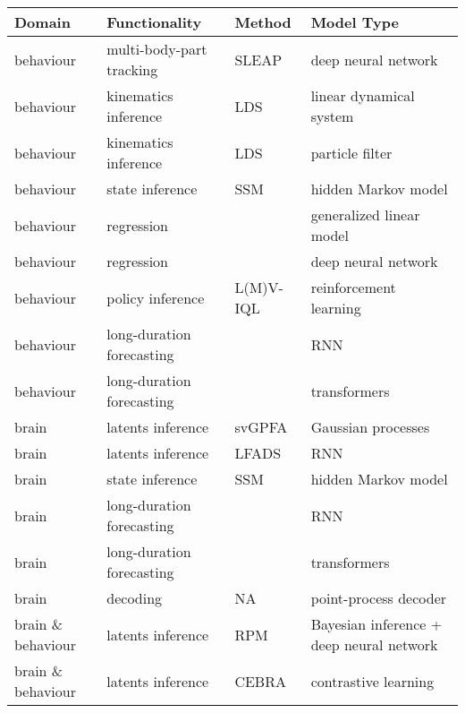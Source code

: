\begin{table}
    \caption{Initial data analysis methods to disseminate}
    \label{table:initialMethodsToDisseminate}
    \begin{longtable}{|p{1.9cm}|p{3cm}|p{2.5cm}|p{4.5cm}|}
        \hline
        \textbf{Domain} & \textbf{Functionality} & \textbf{Method} & \textbf{Model Type} \\
        \hline\hline
        behaviour & multi-body-part tracking & SLEAP & deep neural network \\
        \hline
        behaviour & kinematics inference & LDS & linear dynamical system \\
        \hline
        behaviour & kinematics inference & LDS & particle filter \\
        \hline
        behaviour & state inference & SSM & hidden Markov model \\
        \hline
        behaviour & regression &  & generalized linear model \\
        \hline
        behaviour & regression &  & deep neural network \\
        \hline
        behaviour & policy inference & L(M)V-IQL & reinforcement learning \\
        \hline
        behaviour & long-duration forecasting &  & RNN \\
        \hline
        behaviour & long-duration forecasting &  & transformers \\
        \hline\hline
        brain & latents inference & svGPFA & Gaussian processes \\
        \hline
        brain & latents inference & LFADS & RNN \\
        \hline
        brain & state inference & SSM & hidden Markov model \\
        \hline
        brain & long-duration forecasting &  & RNN \\
        \hline
        brain & long-duration forecasting &  & transformers \\
        \hline
        brain & decoding & NA & point-process decoder \\
        \hline\hline
        brain \& behaviour & latents inference & RPM & Bayesian inference + deep neural network \\
        \hline
        brain \& behaviour & latents inference & CEBRA & contrastive learning \\
        \hline
    \end{longtable}
\end{table}

